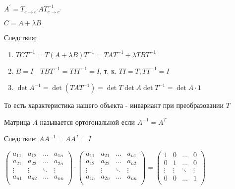 \documentclass[12pt]{article}
\begin{document}
    \begin{MyTheorem}
        \Ths $A^\prime = T_{e\to e^\prime} A T^{-1}_{e\to e^\prime}$
    \end{MyTheorem}

    \Nota $C = A + \lambda B$

    \underline{Следствия}:

    \begin{enumerate}
        \item $TCT^{-1} = T (A + \lambda B) T^{-1} = T A T^{-1} + \lambda T B T^{-1}$

        \item $B = I \quad T B T^{-1} = T I T^{-1} = I$, т. к. $TI = T, T T^{-1} = I$

        \item $\det A^{-1} = \det (T A T^{-1}) = \det T \det A \det T^{-1} = \det A \cdot 1$
    \end{enumerate}

    \Nota То есть характеристика нашего объекта - инвариант при преобразовании $T$

    \hypertarget{orthogonalmatrix}{}

    \Def Матрица $A$ называется ортогональной если $A^{-1} = A^T$

    Следствие: $AA^{-1} = AA^T = I$

    $\begin{pmatrix}
         a_{11} & a_{12} & \dots & a_{1n} \\
         a_{21} & a_{22} & \dots & a_{2n} \\
         \vdots & \vdots & \ddots & \vdots \\
         a_{n1} & a_{n2} & \dots & a_{nn} \\
    \end{pmatrix} \cdot \begin{pmatrix}
         a_{11} & a_{21} & \dots & a_{n1} \\
         a_{12} & a_{22} & \dots & a_{n2} \\
         \vdots & \vdots & \ddots & \vdots \\
         a_{1n} & a_{2n} & \dots & a_{nn} \\
    \end{pmatrix} = \begin{pmatrix}
         1 & 0 & \dots & 0 \\
         0 & 1 & \dots & 0 \\
         \vdots & \vdots & \ddots & \vdots \\
         0 & 0 & \dots & 1 \\
    \end{pmatrix}$
\end{document}
